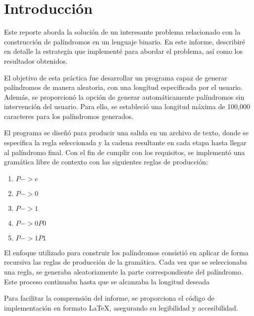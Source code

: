 \chapter{Introducción}
 Este reporte aborda la solución de un interesante problema relacionado con la construcción de palíndromos en un lenguaje binario. En este informe, describiré en detalle la estrategia que implementé para abordar el problema, así como los resultados obtenidos.\newline

El objetivo de esta práctica fue desarrollar un programa capaz de generar palíndromos de manera aleatoria, con una longitud especificada por el usuario. Además, se proporcionó la opción de generar automáticamente palíndromos sin intervención del usuario. Para ello, se estableció una longitud máxima de 100,000 caracteres para los palíndromos generados.\newline

El programa se diseñó para producir una salida en un archivo de texto, donde se especifica la regla seleccionada y la cadena resultante en cada etapa hasta llegar al palíndromo final. Con el fin de cumplir con los requisitos, se implementó una gramática libre de contexto con las siguientes reglas de producción:\newline

\newline
    \begin{enumerate}
    \item $P -> e$
    \newline
    \item $P -> 0$
    \newline
    \item$P -> 1$
    \newline
    \item$P -> 0P0$
    \newline
    \item$P -> 1P1$
    \newline
    \end{enumerate}
    
   El enfoque utilizado para construir los palíndromos consistió en aplicar de forma recursiva las reglas de producción de la gramática. Cada vez que se seleccionaba una regla, se generaba aleatoriamente la parte correspondiente del palíndromo. Este proceso continuaba hasta que se alcanzaba la longitud deseada\newline

Para facilitar la comprensión del informe, se proporciona el código de implementación en formato LaTeX, asegurando su legibilidad y accesibilidad.

